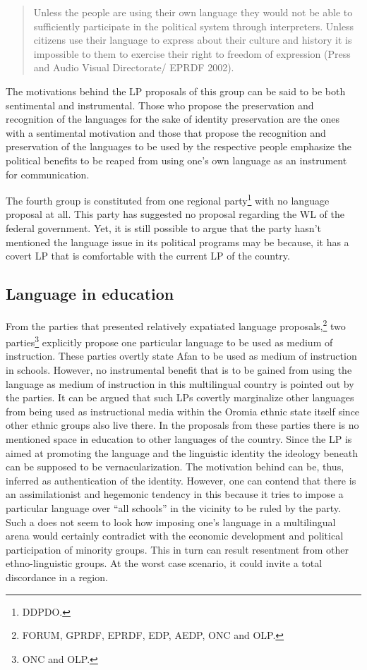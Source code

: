 \documentclass[output=paper,modfonts]{langscibook}
\begin{document}
\begin{quote}
Unless the people are using their own language they would not be able to sufficiently participate in the political system through interpreters. Unless citizens use their language to express about their culture and history it is impossible to them to exercise their right to freedom of expression (Press and Audio Visual Directorate/ EPRDF 2002).
\end{quote}

The motivations behind the LP proposals of this group can be said to be both sentimental and instrumental. Those who propose the preservation and recognition of the languages for the sake of identity preservation are the ones with a sentimental motivation and those that propose the recognition and preservation of the languages to be used by the respective people emphasize the political benefits to be reaped from using one’s own language as an instrument for communication. 

The fourth group is constituted from one regional party\footnote{DDPDO.} with no language proposal at all. This party has suggested no proposal regarding the WL of the federal government. Yet, it is still possible to argue that the party hasn’t mentioned the language issue in its political programs may be because, it has a covert LP that is comfortable with the current LP of the country.
 
\subsection{Language in education} 

From the parties that presented relatively expatiated language proposals,\footnote{FORUM, GPRDF, EPRDF, EDP, AEDP, ONC and OLP.} two parties\footnote{ONC and OLP.} explicitly propose one particular language to be used as medium of instruction. These parties overtly state Afan  to be used as medium of instruction in schools. However, no instrumental benefit that is to be gained from using the language as medium of instruction in this multilingual country is pointed out by the parties. It can be argued that such LPs covertly marginalize other languages from being used as instructional media within the Oromia ethnic state itself since other ethnic groups also live there. In the proposals from these parties there is no mentioned space in education to other languages of the country. Since the LP is aimed at promoting the language and the linguistic identity the ideology beneath can be supposed to be vernacularization. The motivation behind can be, thus, inferred as authentication of the  identity. However, one can contend that there is an assimilationist and hegemonic tendency in this  because it tries to impose a particular language over “all schools” in the vicinity to be ruled by the party. Such a  does not seem to look how imposing one’s language in a multilingual arena would certainly contradict with the economic development and political participation of minority groups. This in turn can result resentment from other ethno-linguistic groups. At the worst case scenario, it could invite a total discordance in a region.
\end{document}
